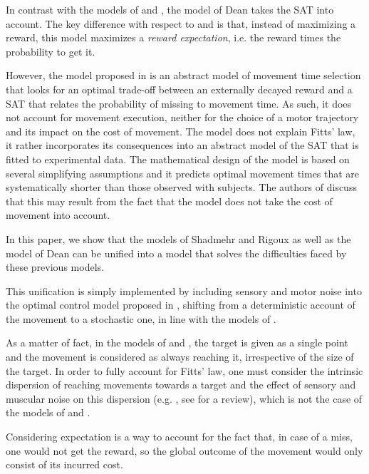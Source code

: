 \documentclass[10pt]{article}
\begin{document}
In contrast with the models of \cite{shadmehr10} and \cite{rigoux12}, the model of Dean \cite{Dean2007} takes the SAT into account. The key difference with respect to \cite{shadmehr10} and \cite{rigoux12} is that, instead of maximizing a reward, this model maximizes a {\em reward expectation}, i.e. the reward times the probability to get it.

However, the model proposed in \cite{Dean2007} is an abstract model of movement time selection that looks for an optimal trade-off between an externally decayed reward and a SAT that relates the probability of missing to movement time. As such, it does not account for movement execution, neither for the choice of a motor trajectory and its impact on the cost of movement.
The model does not explain Fitts' law, it rather incorporates its consequences into an abstract model of the SAT that is fitted to experimental data.
The mathematical design of the model is based on several simplifying assumptions and it predicts optimal movement times that are systematically shorter than those observed with subjects. The authors of \cite{Dean2007} discuss that this may result from the fact that the model does not take the cost of movement into account.

In this paper, we show that the models of Shadmehr \cite{shadmehr10} and Rigoux \cite{rigoux12} as well as the model of Dean \cite{Dean2007} can be unified into a model that solves the difficulties faced by these previous models. 

This unification is simply implemented by including sensory and motor noise into the optimal control model proposed in \cite{rigoux12}, shifting from a deterministic account of the movement to a stochastic one, in line with the models of \cite{harris98_N,todorov02_NN,todorov04_NN,todorov05_NC,li2006}.

As a matter of fact, in the models of \cite{shadmehr10} and \cite{rigoux12}, the target is given as a single point and the movement is considered as always reaching it, irrespective of the size of the target. In order to fully account for Fitts' law, one must consider the intrinsic dispersion of reaching movements towards a target and the effect of sensory and muscular noise on this dispersion (e.g. \cite{harris98_N}, see \cite{faisal08} for a review), which is not the case of the models of \cite{shadmehr10} and \cite{rigoux12}. 

Considering expectation is a way to account for the fact that, in case of a miss, one would not get the reward, so the global outcome of the movement would only consist of its incurred cost. 
\end{document}
